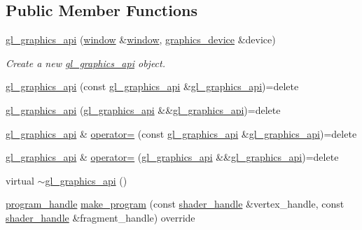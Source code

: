 \subsection*{Public Member Functions}
\begin{DoxyCompactItemize}
\item 
\mbox{\hyperlink{classmoka_1_1gl__graphics__api_a8e65801bf2edf0891bae8936f964ed0f}{gl\+\_\+graphics\+\_\+api}} (\mbox{\hyperlink{classmoka_1_1window}{window}} \&\mbox{\hyperlink{classmoka_1_1window}{window}}, \mbox{\hyperlink{classmoka_1_1graphics__device}{graphics\+\_\+device}} \&device)
\begin{DoxyCompactList}\small\item\em Create a new \mbox{\hyperlink{classmoka_1_1gl__graphics__api}{gl\+\_\+graphics\+\_\+api}} object. \end{DoxyCompactList}\item 
\mbox{\hyperlink{classmoka_1_1gl__graphics__api_a59aae29a0b801cccdba2c8017dd527b2}{gl\+\_\+graphics\+\_\+api}} (const \mbox{\hyperlink{classmoka_1_1gl__graphics__api}{gl\+\_\+graphics\+\_\+api}} \&\mbox{\hyperlink{classmoka_1_1gl__graphics__api}{gl\+\_\+graphics\+\_\+api}})=delete
\item 
\mbox{\hyperlink{classmoka_1_1gl__graphics__api_ac8d4092253d54466c1a4b24d21687aa8}{gl\+\_\+graphics\+\_\+api}} (\mbox{\hyperlink{classmoka_1_1gl__graphics__api}{gl\+\_\+graphics\+\_\+api}} \&\&\mbox{\hyperlink{classmoka_1_1gl__graphics__api}{gl\+\_\+graphics\+\_\+api}})=delete
\item 
\mbox{\hyperlink{classmoka_1_1gl__graphics__api}{gl\+\_\+graphics\+\_\+api}} \& \mbox{\hyperlink{classmoka_1_1gl__graphics__api_a4a495079c68daf3d38cd9113bcbcd008}{operator=}} (const \mbox{\hyperlink{classmoka_1_1gl__graphics__api}{gl\+\_\+graphics\+\_\+api}} \&\mbox{\hyperlink{classmoka_1_1gl__graphics__api}{gl\+\_\+graphics\+\_\+api}})=delete
\item 
\mbox{\hyperlink{classmoka_1_1gl__graphics__api}{gl\+\_\+graphics\+\_\+api}} \& \mbox{\hyperlink{classmoka_1_1gl__graphics__api_abe24b702c20cb1e3c2020bc9b878af2e}{operator=}} (\mbox{\hyperlink{classmoka_1_1gl__graphics__api}{gl\+\_\+graphics\+\_\+api}} \&\&\mbox{\hyperlink{classmoka_1_1gl__graphics__api}{gl\+\_\+graphics\+\_\+api}})=delete
\item 
virtual \mbox{\hyperlink{classmoka_1_1gl__graphics__api_ab5d814cde989805e9518444decf268e5}{$\sim$gl\+\_\+graphics\+\_\+api}} ()
\item 
\mbox{\hyperlink{structmoka_1_1program__handle}{program\+\_\+handle}} \mbox{\hyperlink{classmoka_1_1gl__graphics__api_a41f333c5adcb85036c2d0246a586ec78}{make\+\_\+program}} (const \mbox{\hyperlink{structmoka_1_1shader__handle}{shader\+\_\+handle}} \&vertex\+\_\+handle, const \mbox{\hyperlink{structmoka_1_1shader__handle}{shader\+\_\+handle}} \&fragment\+\_\+handle) override

\end{DoxyCompactItemize}
